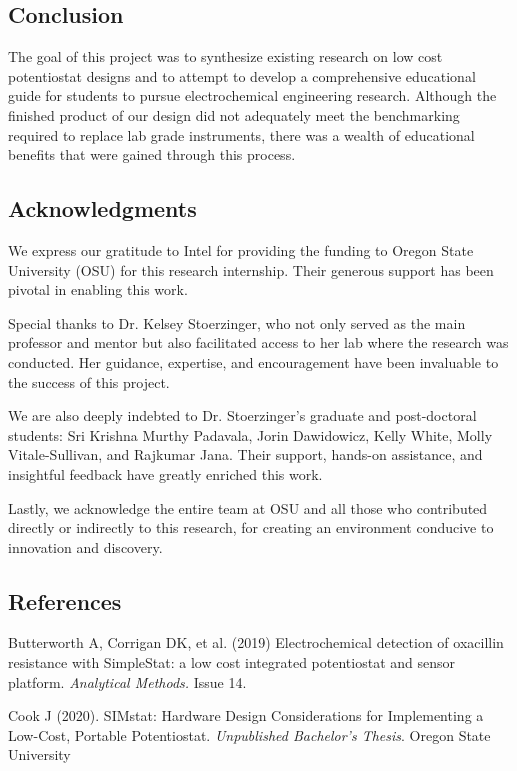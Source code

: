 \documentclass{article}
\begin{document}
\subsection*{Conclusion}
The goal of this project was to synthesize existing research on low cost potentiostat designs and to attempt to develop a comprehensive educational guide for students to pursue electrochemical engineering research. Although the finished product of our design did not adequately meet the benchmarking required to replace lab grade instruments, there was a wealth of educational benefits that were gained through this process. 


\subsection*{Acknowledgments}

We express our gratitude to Intel for providing the funding to Oregon State University (OSU) for this research internship. Their generous support has been pivotal in enabling this work.

Special thanks to Dr. Kelsey Stoerzinger, who not only served as the main professor and mentor but also facilitated access to her lab where the research was conducted. Her guidance, expertise, and encouragement have been invaluable to the success of this project.

We are also deeply indebted to Dr. Stoerzinger's graduate and post-doctoral students: Sri Krishna Murthy Padavala, Jorin Dawidowicz, Kelly White, Molly Vitale-Sullivan, and Rajkumar Jana. Their support, hands-on assistance, and insightful feedback have greatly enriched this work.

Lastly, we acknowledge the entire team at OSU and all those who contributed directly or indirectly to this research, for creating an environment conducive to innovation and discovery.

\subsection*{References}
Butterworth A, Corrigan DK, et al. (2019) Electrochemical detection of oxacillin resistance with SimpleStat: a low cost integrated potentiostat and sensor platform. \emph{Analytical Methods.} Issue 14. 

Cook J (2020). SIMstat: Hardware Design Considerations for Implementing a Low-Cost, Portable Potentiostat. \emph{Unpublished Bachelor's Thesis}. Oregon State University
\end{document}
